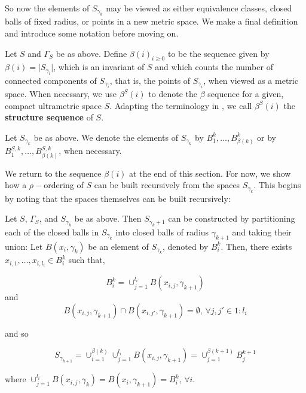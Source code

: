 So now the elements of $S_{\gamma_k}$ may be viewed as either equivalence classes, closed balls of fixed radius, or points in a new metric space. We  make a final definition and introduce some notation before moving on.

\begin{definition*}
Let $S$ and $\Gamma_S$ be as above. Define $\beta(i)_{i \geq 0}$ to be the sequence given by $\beta(i) = \lvert  S_{\gamma_i}\rvert$, which is an invariant of $S$ and which counts the number of connected components of $S_{\gamma_i}$, that is, the points of $S_{\gamma_i}$, when viewed as a metric space. When necessary, we use $\beta^S(i)$ to denote the $\beta$ sequence for a given, compact  ultrametric space $S$. Adapting the terminology in \cite{fp}, we call $\beta^S(i)$ the \textbf{structure sequence} of $S$.
\end{definition*}

\begin{notation*}
Let $S_{\gamma_k}$ be as above. We denote the elements of $S_{\gamma_k}$ by $B^k_1, \ldots, B^k_{\beta(k)}$ or by $B^{S,k}_1, \ldots, B^{S,k}_{\beta(k)}$, when necessary.
\end{notation*}


We return to the sequence $\beta(i)$ at the end of this section. For now, we show how a $\rho-$ordering of $S$ can be built recursively from the spaces $S_{\gamma_k}$. This begins by noting that the spaces themselves can be built recursively:

\begin{observation*}
Let $S$, $\Gamma_S$, and $S_{\gamma_k}$ be as above. Then $S_{\gamma_k+1}$ can be constructed by partitioning each of the closed balls in $S_{\gamma_k}$ into closed balls of radius $\gamma_{k+1}$ and taking their union:  Let $B(x_i, \gamma_k)$  be an element of $S_{\gamma_k}$, denoted by  $B^k_i$. Then, there exists $x_{i,1},\ldots, x_{i,l_{i}} \in B^k_i$ such that,

\[B^k_i=  \cup_{j=1}^{l_i} B(x_{i,j}, \gamma_{k+1})\] and  \[B(x_{i,j}, \gamma_{k+1}) \cap B(x_{i,j'}, \gamma_{k+1}) = \emptyset \text{, }\forall j,j' \in 1:l_i\] 

and so

\[S_{\gamma_{k+1}} =  \cup_{i=1}^{\beta(k)}   \cup_{j=1}^{l_i} B(x_{i,j}, \gamma_{k+1}) = \cup^{\beta(k+1)}_{j=1}B^{k+1}_{j}\] 


where $\cup_{j=1}^{l_i} B(x_{i,j},\gamma_{k})=B(x_i, \gamma_{k+1}) = B^k_i$, $\forall i$.
\end{observation*}

